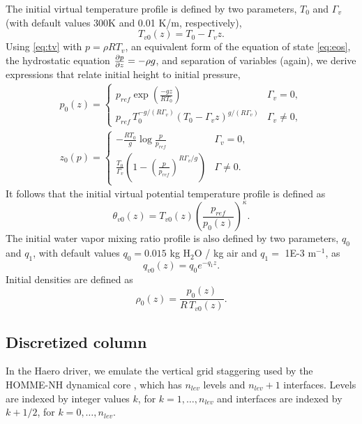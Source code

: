 The initial virtual temperature profile is defined by two parameters, $T_{0}$ and $\Gamma_v$ (with default values 300K and 0.01 K/m, respectively),
\begin{equation}\label{eq:tv}
  T_{v0}(z) = T_{0} - \Gamma_v z.
\end{equation}
Using \eqref{eq:tv} with $p=\rho R T_v$, an equivalent form of the equation of state \eqref{eq:eos}, the hydrostatic equation $\frac{\partial p }{\partial z} = -\rho g$, and separation of variables (again), we derive expressions that relate initial height to initial pressure,
\begin{align}
  p_0(z) = \begin{cases}
          p_{ref}\exp\left(\frac{-g z}{R T_{0}}\right) & \Gamma_v = 0,\\[0.5em]
          p_{ref}\, T_0^{-g/(R\Gamma_v)}\left(T_{0} - \Gamma_v z\right)^{g/(R\Gamma_v)} & \Gamma_v \ne 0,
        \end{cases} \label{eq:p_of_z}\\[0.5em]
  z_0(p) = \begin{cases}
         -\frac{R T_{0}}{g}\log\frac{p}{p_{ref}} & \Gamma_v = 0,\\[0.5em]
         \frac{T_{0}}{\Gamma_v}\left(1 - \left(\frac{p}{p_{ref}}\right)^{R\Gamma_v/g}\right) & \Gamma \ne 0.
       \end{cases}\label{eq:z_of_p}
\end{align}
It follows that the initial virtual potential temperature profile is defined as
\begin{equation}
  \theta_{v0}(z) = T_{v0}(z)\left(\frac{p_{ref}}{p_0(z)}\right)^\kappa.
\end{equation}
The initial water vapor mixing ratio profile is also defined by two parameters, $q_0$ and $q_1$, with default values $q_0=0.015$ kg H$_2$O / kg air and $q_1 = $ 1E-3 m$^{-1}$, as
\begin{equation}
  q_{v0}(z) = q_0e^{-q_1 z}.
\end{equation}
Initial densities are defined as
\begin{equation}
  \rho_0(z) = \frac{p_0(z)}{R\,T_{v0}(z)}.
\end{equation}

\subsection{Discretized column}

In the Haero driver, we emulate the vertical grid staggering used by the HOMME-NH dynamical core \cite{Taylor2020}, which has $n_{lev}$ levels and $n_{lev}+1$ interfaces.
Levels are indexed by integer values $k$, for $k=1,\dotsc,n_{lev}$ and interfaces are indexed by $k+1/2$, for $k=0,\dotsc,n_{lev}$.

